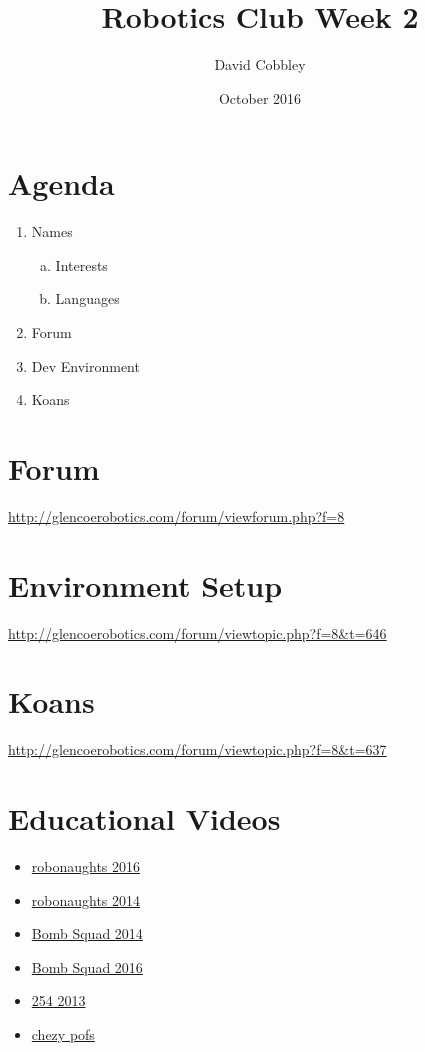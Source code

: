 \documentclass{article}
\title{Robotics Club Week 2}
\author{David Cobbley }
\date{October 2016}
\begin{document}
\maketitle

\section{Agenda}
\begin{enumerate}
    \item Names
    \begin{enumerate}[(a)]
        \item Interests
        \item Languages
    \end{enumerate}
    \item Forum
    \item Dev Environment
    \item Koans
\end{enumerate}

\section{Forum}
\url{http://glencoerobotics.com/forum/viewforum.php?f=8}

\section{Environment Setup}
\url{http://glencoerobotics.com/forum/viewtopic.php?f=8&t=646}

\section{Koans}
\url{http://glencoerobotics.com/forum/viewtopic.php?f=8&t=637}

\section{Educational Videos}
\begin{itemize}
    \item \href{https://www.youtube.com/watch?v=sWHwDfpeYjo}{robonaughts 2016}
    \item \href{https://www.youtube.com/watch?v=PtRewwr59d8}{robonaughts 2014}
    \item \href{https://www.youtube.com/watch?v=lcsi4zBwIjc}{Bomb Squad 2014}
    \item \href{https://www.youtube.com/watch?v=anT0a50Z0x0}{Bomb Squad 2016}
    \item \href{https://www.team254.com/first/2013/}{254 2013}
    \item \href{https://www.youtube.com/watch?v=RpSgUrsghv4}{chezy pofs}
    
\end{itemize}
\end{document}
